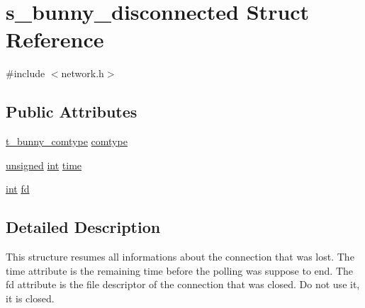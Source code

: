 \hypertarget{structs__bunny__disconnected}{\section{s\-\_\-bunny\-\_\-disconnected Struct Reference}
\label{structs__bunny__disconnected}
}


{\ttfamily \#include $<$network.\-h$>$}

\subsection*{Public Attributes}
\begin{DoxyCompactItemize}
\item 
\hyperlink{network_8h_ac01621d0080b82d3bebc95c8338b24ce}{t\-\_\-bunny\-\_\-comtype} \hyperlink{structs__bunny__disconnected_a39507b3dfd83feca1af66d874c540673}{comtype}
\item 
\hyperlink{curses_8priv_8h_aca40206900cfc164654362fa8d4ad1e6}{unsigned} \hyperlink{term__entry_8h_ad65b480f8c8270356b45a9890f6499ae}{int} \hyperlink{structs__bunny__disconnected_a6be551100d11ee0b2da193a700af1d52}{time}
\item 
\hyperlink{term__entry_8h_ad65b480f8c8270356b45a9890f6499ae}{int} \hyperlink{structs__bunny__disconnected_a7f9c7aebb44f2646df1d316184f4bd35}{fd}
\end{DoxyCompactItemize}


\subsection{Detailed Description}
This structure resumes all informations about the connection that was lost. The time attribute is the remaining time before the polling was suppose to end. The fd attribute is the file descriptor of the connection that was closed. Do not use it, it is closed. 

